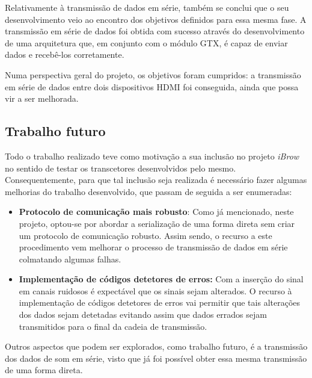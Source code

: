 \documentclass[a4paper]{IEEEtran}
\begin{document}
Relativamente à transmissão de dados em série, também se conclui que o seu desenvolvimento veio ao encontro dos objetivos definidos para essa mesma fase. A transmissão em série de dados foi obtida com sucesso através do desenvolvimento de uma arquitetura que, em conjunto com o módulo GTX, é capaz de enviar dados e recebê-los corretamente.

Numa perspectiva geral do projeto, os objetivos foram cumpridos: a transmissão em série de dados entre dois dispositivos HDMI foi conseguida, ainda que possa vir a ser melhorada. 

\subsection{Trabalho futuro}

Todo o trabalho realizado teve como motivação a sua inclusão no projeto \textit{iBrow} no sentido de testar os transcetores desenvolvidos pelo mesmo. Consequentemente, para que tal inclusão seja realizada é necessário fazer algumas melhorias do trabalho desenvolvido, que passam de seguida a ser enumeradas:
\begin{itemize}
	\item \textbf{Protocolo de comunicação mais robusto}: Como já mencionado, neste projeto, optou-se por abordar a serialização de uma forma direta sem criar um protocolo de comunicação robusto. Assim sendo, o recurso a este procedimento vem melhorar o processo de transmissão de dados em série colmatando algumas falhas.
	
	\item \textbf{Implementação de códigos detetores de erros:} Com a inserção do sinal em canais ruidosos é expectável que os sinais sejam alterados. O recurso à implementação de códigos detetores de erros vai permitir que tais alterações dos dados sejam detetadas evitando assim que dados errados sejam transmitidos para o final da cadeia de transmissão.
\end{itemize}

Outros aspectos que podem ser explorados, como trabalho futuro, é a transmissão dos dados de som em série, visto que já foi possível obter essa mesma transmissão de uma forma direta.

%
%
\end{document}
